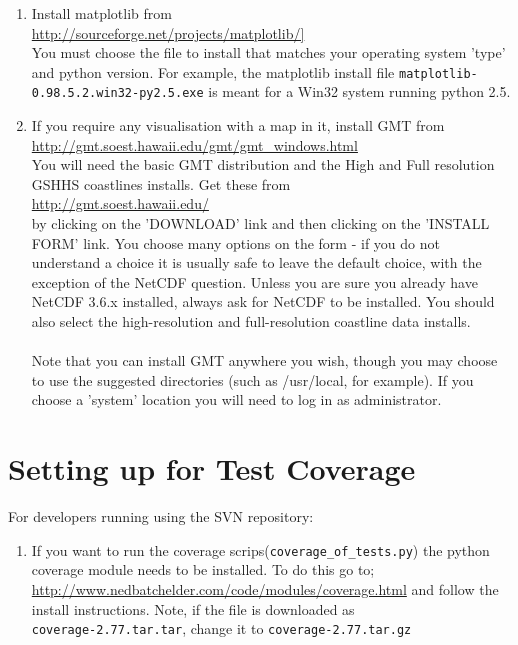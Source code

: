 \documentclass[a4paper, 12pt]{article}
\begin{document}
\begin{enumerate}
\item Install matplotlib from \\
\url{http://sourceforge.net/projects/matplotlib/]} \\
You must choose the file to install that matches your operating
system 'type' and python version. For example, the matplotlib
install file \texttt{matplotlib-0.98.5.2.win32-py2.5.exe} is meant
for a Win32 system running python 2.5.

\item If you require any visualisation with a map in it, install GMT
from \\
\url{http://gmt.soest.hawaii.edu/gmt/gmt_windows.html} \\
You will need the basic GMT distribution and the High and Full
resolution GSHHS coastlines installs.  Get these from \\
\url{http://gmt.soest.hawaii.edu/} \\
by clicking on the 'DOWNLOAD' link and then clicking on the 'INSTALL
FORM' link.  You choose many options on the form - if you do not
understand a choice it is usually safe to leave the default choice,
with the exception of the NetCDF question. Unless you are sure you
already have NetCDF 3.6.x installed, always ask for NetCDF to be
installed.  You should also select the high-resolution and
full-resolution coastline data installs. \\
\\
Note that you can install GMT anywhere you wish, though you may
choose to use the suggested directories (such as /usr/local, for
example). If you choose a 'system' location you will need to log in
as administrator.

\end{enumerate}


\section{Setting up for Test Coverage} \label{sec:test-coverage}

For developers running using the SVN repository:
\begin{enumerate}
\item If you want to run the coverage scrips(\texttt{coverage\_of\_tests.py}) the
python coverage module needs to be installed.  To do this go to; \\
\url{http://www.nedbatchelder.com/code/modules/coverage.html} and
follow the install instructions. Note, if the file is downloaded as
\\ \texttt{coverage-2.77.tar.tar}, change it to
\texttt{coverage-2.77.tar.gz}
\end{enumerate}
\end{document}
